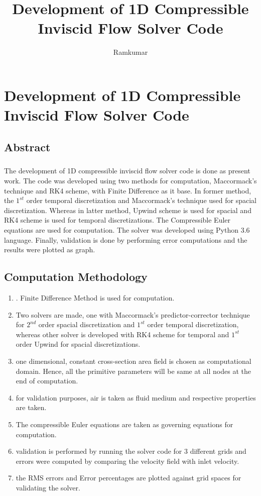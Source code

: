 \documentclass[a4paper]{report}
\title{Development of 1D Compressible Inviscid Flow Solver Code}
\author{Ramkumar}
\begin{document}
	\maketitle
	\newpage
	\tableofcontents
	\listoffigures
	
	\chapter{Development of 1D Compressible Inviscid Flow Solver Code}
	
	\section{Abstract}
	\paragraph*{}
	The development of 1D compressible inviscid flow solver code is done as present work. The code was developed using two methods for computation, Maccormack's technique and RK4 scheme, with Finite Difference as it base. In former method, the $1^{st}$ order temporal discretization and Maccormack's technique used for spacial discretization. Whereas in latter method, Upwind scheme is used for spacial and RK4 scheme is used for temporal discretizations. The Compressible Euler equations are used for computation. The solver was developed using Python 3.6 language. Finally, validation is done by performing error computations and the results were plotted as graph.
	
	\section{Computation Methodology}
	\begin{enumerate}
		\item. Finite Difference Method is used for computation.
		\item  Two solvers are made, one with Maccormack's predictor-corrector technique for $2^{nd}$ order spacial discretization and $1^{st}$ order temporal discretization, whereas other solver is developed with RK4 scheme for temporal and $1^{st}$ order Upwind for spacial discretizations.
		\item  one dimensional, constant cross-section area field is chosen as computational domain. Hence, all the primitive parameters will be same at all nodes at the end of computation.
		\item  for validation purposes, air is taken as fluid medium and respective properties are taken.
		\item The compressible Euler equations are taken as governing equations for computation.
		\item validation is performed by running the solver code for 3 different grids and errors were computed by comparing the velocity field with inlet velocity.
		\item the RMS errors and Error percentages are plotted against grid spaces for validating the solver.		
	\end{enumerate} 
\end{document}
